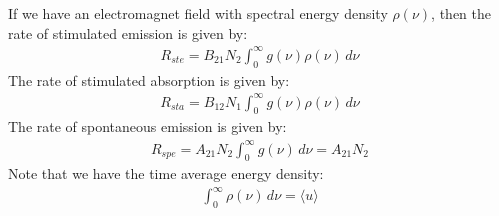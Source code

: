 \documentclass[11pt]{book}
\theoremstyle{break}
\theoremstyle{break}
\begin{document}
If we have an electromagnet field with spectral energy density $\rho(\nu)$, then the rate of stimulated emission is given by:
\begin{align*}
R_{ste} = B_{21}N_2 \int_0^{\infty}g(\nu)\rho(\nu) \, d\nu
\end{align*}
The rate of stimulated absorption is given by:
\begin{align*}
R_{sta} = B_{12}N_1\int_{0}^{\infty}g(\nu) \rho(\nu) \, d\nu
\end{align*}
The rate of spontaneous emission is given by:
\begin{align*}
R_{spe} = A_{21}N_2 \int_0^{\infty}g(\nu) \, d\nu = A_{21}N_2
\end{align*}
Note that we have the time average energy density:
\begin{align*}
\int_{0}^\infty \rho(\nu) \,d\nu = \langle u\rangle
\end{align*}
\end{document}
